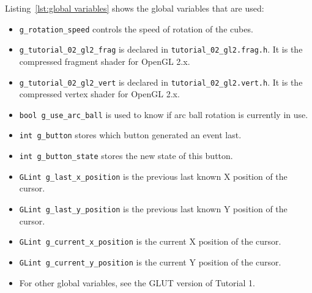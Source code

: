 \documentclass[11pt,oneside,a4paper,final]{article}
\begin{document}
Listing~\ref{lst:global variables} shows the global variables that are used:
\begin{itemize}

 \item \verb+g_rotation_speed+ controls the speed of rotation  of the cubes. 

 \item \verb+g_tutorial_02_gl2_frag+  is declared in \verb+tutorial_02_gl2.frag.h+. 
 It is the compressed fragment shader for OpenGL 2.x.
 
 \item \verb+g_tutorial_02_gl2_vert+  is declared in \verb+tutorial_02_gl2.vert.h+. 
 It is the compressed vertex shader for OpenGL 2.x.

% 

\item \verb+bool g_use_arc_ball+ is used to know if arc ball rotation is currently in use.

\item \verb+int g_button+ stores which button generated an event last.

\item \verb+int g_button_state+ stores the new state of this button.

\item \verb+GLint g_last_x_position+ is the previous last known X position of the cursor.

\item \verb+GLint g_last_y_position+ is the previous last known Y position of the cursor.

\item \verb+GLint g_current_x_position+ is the current X position of the cursor.

\item \verb+GLint g_current_y_position+ is the current Y position of the cursor.

	 \item For other global variables, see the GLUT version of Tutorial 1.
\end{itemize}


\begin{center}

\end{center}
\end{document}
